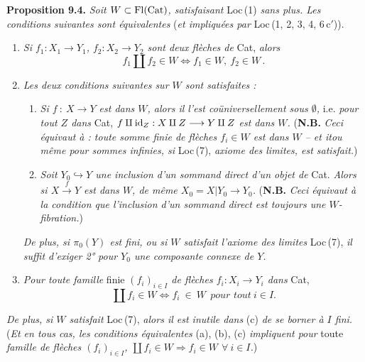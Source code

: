\textbf{Proposition 9.4.} \textit{Soit $W\subset\mathrm{Fl}(\mathrm{Cat})$, satisfaisant} Loc\,(1) \textit{sans plus. Les conditions suivantes sont équivalentes} (\textit{et impliquées par} Loc\,(1, 2, 3, 4, 6\,c$'$)).
\begin{enumerate}[label={}, leftmargin=2.5em]
\item[a)] \textit{Si $f_1 : X_1\longrightarrow Y_1$, $f_2 : X_2\longrightarrow Y_2$ sont deux flèches de} Cat, \textit{alors}
\[
f_1\amalg f_2\in W\iff f_1\in W,\ f_2\in W\,.
\]
\item[b)] \textit{Les deux conditions suivantes sur $W$ sont satisfaites :}


\begin{enumerate}[label={}, leftmargin=2.5em]
\item[1°)] \textit{Si $f\ :\ X\longrightarrow Y$ est dans $W$, alors il l'est coüniversellement sous $\emptyset$,} i.e. \textit{pour tout $Z$ dans} Cat, \textit{$f\amalg\mathrm{id}_Z : X\amalg Z\longrightarrow Y\amalg Z$ est dans $W$.} (\textbf{N.B.} \textit{Ceci équivaut à : toute somme finie de flèches $f_i\in W$ est dans $W$ – et itou même pour sommes infinies, si} Loc\,(7), \textit{axiome des limites, est satisfait.})
\item[2°)] \textit{Soit $Y_0\hookrightarrow Y$ une inclusion d'un sommand direct d'un objet de} Cat. \textit{Alors si $X\xrightarrow{\ f\ }Y$ est dans $W$, de même $X_0=X|Y_0\longrightarrow Y_0$.} (\textbf{N.B.} \textit{Ceci équivaut à la condition que l'inclusion d'un sommand direct est toujours une $W$-fibration.})
\end{enumerate}

\textit{De plus, si $\pi_0(Y)$ est fini, ou si $W$ satisfait l'axiome des limites} Loc\,(7), \textit{il suffit d'exiger 2° pour $Y_0$ une composante connexe de $Y$.}


\item[c)] \textit{Pour toute famille} finie \textit{$(f_i)_{i\in I}$ de flèches $f_i : X_i\longrightarrow Y_i$ dans} Cat,
\[
\coprod f_i\in W\iff f_i\ \in\ W\ \ \textit{pour tout}\ i\in I.
\]
\end{enumerate}
\textit{De plus, si $W$ satisfait} Loc\,(7), \textit{alors il est inutile dans} (c) \textit{de se borner à $I$ fini.} (\textit{Et en tous cas, les conditions équivalentes} (a), (b), (c) \textit{impliquent pour} toute \textit{famille de flèches $(f_i)_{i\in I}$, $\coprod f_i\in W\Longrightarrow f_i\in W$ $\forall\ i\in I$.})

